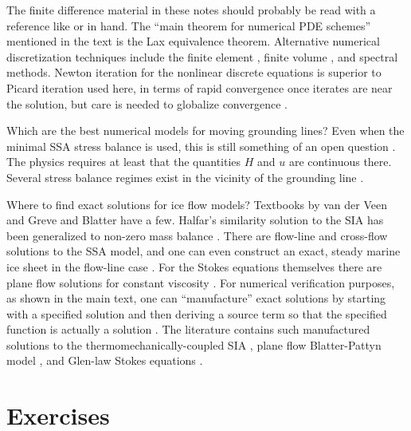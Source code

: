 \documentclass[letterpaper,final,12pt,reqno]{amsart}
\begin{document}
The finite difference material in these notes should probably be read with a reference like \cite{LeVequeFD} or \cite{MortonMayers} in hand.  The ``main theorem for numerical PDE schemes'' mentioned in the text is the Lax equivalence theorem.  Alternative numerical discretization techniques include the finite element \cite{Braess}, finite volume \cite{LeVeque}, and spectral \cite{Trefethen} methods.  Newton iteration for the nonlinear discrete equations is superior to Picard iteration used here, in terms of rapid convergence once iterates are near the solution, but care is needed to globalize convergence \cite{Kelley}.

Which are the best numerical models for moving grounding lines?  Even when the minimal SSA stress balance is used, this is still something of an open question \cite{Feldmannetal2014,Goldbergetal2009,MISMIP3d2013,MISMIP2012,SchoofMarine1}.  The physics requires at least that the quantities $H$ and $u$ are continuous there.  Several stress balance regimes exist in the vicinity of the grounding line \cite{SchoofMarine2}.

Where to find exact solutions for ice flow models?  Textbooks by van der Veen \cite{vanderVeen} and Greve and Blatter \cite{GreveBlatter2009} have a few.  Halfar's similarity solution to the SIA \cite{Halfar81,Halfar83} has been generalized to non-zero mass balance \cite{BLKCB}.  There are flow-line \cite{Bodvardsson,vanderVeen83} and cross-flow \cite{SchoofStream} solutions to the SSA model, and one can even construct an exact, steady marine ice sheet in the flow-line case \cite{Bueler2014exactmarine}.  For the Stokes equations themselves there are plane flow solutions for constant viscosity \cite{BaliseRaymond1985}.  For numerical verification purposes, as shown in the main text, one can ``manufacture'' exact solutions by starting with a specified solution and then deriving a source term so that the specified function is actually a solution \cite{Roache}.  The literature contains such manufactured solutions to the thermomechanically-coupled SIA \cite{BBL}, plane flow Blatter-Pattyn model \cite{GlowinskiRappaz}, and Glen-law Stokes equations \cite{JouvetRappaz2011,Lengetal2012,SargentFastook2010}.

\footnotesize

\bigskip
\bigskip
%
%


\bigskip
\bigskip
\small
\section*{Exercises}
\end{document}
